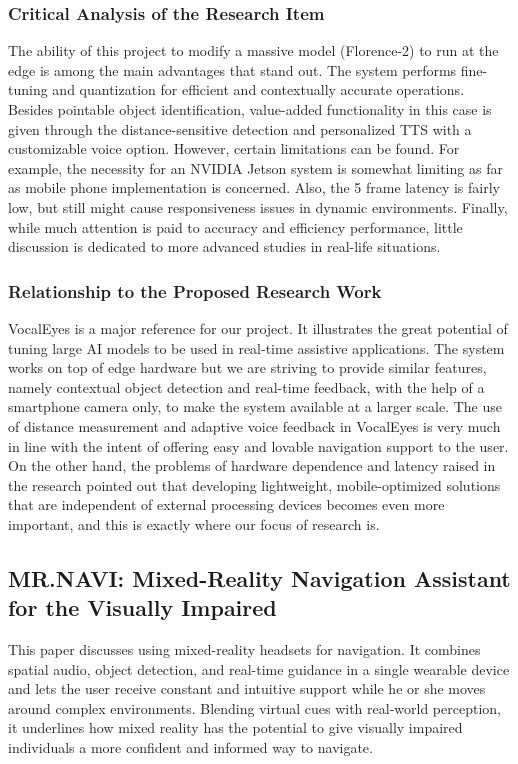 \documentclass{FastFyp}
\begin{document}
\subsubsection{Critical Analysis of the Research Item}  
The ability of this project to modify a massive model (Florence-2) to run at the edge is among the main advantages that stand out. The system performs fine-tuning and quantization for efficient and contextually accurate operations. Besides pointable object identification, value-added functionality in this case is given through the distance-sensitive detection and personalized TTS with a customizable voice option. However, certain limitations can be found. For example, the necessity for an NVIDIA Jetson system is somewhat limiting as far as mobile phone implementation is concerned. Also, the 5 frame latency is fairly low, but still might cause responsiveness issues in dynamic environments. Finally, while much attention is paid to accuracy and efficiency performance, little discussion is dedicated to more advanced studies in real-life situations.

\subsubsection{Relationship to the Proposed Research Work}  
VocalEyes \cite{ref:chavan2024vocaleyes} is a major reference for our project. It illustrates the great potential of tuning large AI models to be used in real-time assistive applications. The system works on top of edge hardware but we are striving to provide similar features, namely contextual object detection and real-time feedback, with the help of a smartphone camera only, to make the system available at a larger scale. The use of distance measurement and adaptive voice feedback in VocalEyes is very much in line with the intent of offering easy and lovable navigation support to the user. On the other hand, the problems of hardware dependence and latency raised in the research pointed out that developing lightweight, mobile-optimized solutions that are independent of external processing devices becomes even more important, and this is exactly where our focus of research is.

\subsection{MR.NAVI: Mixed-Reality Navigation Assistant for the Visually Impaired}
This paper discusses using mixed-reality headsets for navigation. It combines spatial audio, object detection, and real-time guidance in a single wearable device and lets the user receive constant and intuitive support while he or she moves around complex environments. Blending virtual cues with real-world perception, it underlines how mixed reality has the potential to give visually impaired individuals a more confident and informed way to navigate.
\end{document}
